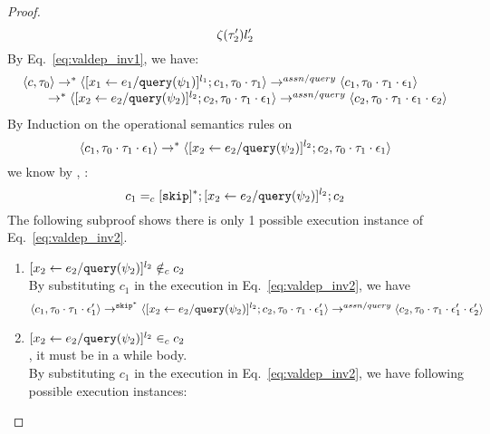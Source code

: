 {\begin{proof}
\begin{equation}
  \mathtt{\zeta}(\mathtt{\tau}_2') l_2'
\end{equation}
%
%
%
 By Eq.~\ref{eq:valdep_inv1}, we have:
\[
  \begin{array}{l}   
\langle {c}, \mathtt{\tau}_0 \rangle \rightarrow^{*} 
\langle [\mathrel{ {x}_1 \leftarrow e_1 / {\tt query}(\psi_1) }]^{l_1} ; {c}_1, \mathtt{\tau}_0 \cdot \mathtt{\tau}_1 \rangle  \rightarrow^{assn/query}
 \langle c_1, \mathtt{\tau}_0 \cdot \mathtt{\tau}_1 \cdot \mathtt{\epsilon}_1 \rangle \\
  \qquad \rightarrow^{*} 
  \langle [\mathrel{ {x}_2 \leftarrow e_2 / {\tt query}(\psi_2) }]^{l_2};{c}_2, 
  \mathtt{\tau}_0 \cdot \mathtt{\tau}_1 \cdot \mathtt{\epsilon}_1 \rangle 
  \rightarrow^{assn/query} 
  \langle {c}_2,  \mathtt{\tau}_0 \cdot \mathtt{\tau}_1 \cdot \mathtt{\epsilon}_1 \cdot \mathtt{\epsilon}_2 \rangle 
\end{array}
 \]
 By Induction on the operational semantics rules on 
 \[\langle c_1, \mathtt{\tau}_0 \cdot \mathtt{\tau}_1 \cdot \mathtt{\epsilon}_1 \rangle
  \rightarrow^{*} 
  \langle [\mathrel{ {x}_2 \leftarrow e_2 / {\tt query}(\psi_2) }]^{l_2};{c}_2, 
  \mathtt{\tau}_0 \cdot \mathtt{\tau}_1 \cdot \mathtt{\epsilon}_1 \rangle \]
 we know by  , :
 \[
 c_1 =_c 
 [\mathtt{skip}]{}^*;[\mathrel{ {x}_2 \leftarrow e_2 / {\tt query}(\psi_2) }]^{l_2};{c}_2
 \]
The following subproof shows there is only 1 possible execution instance of Eq.~\ref{eq:valdep_inv2}.
\begin{subproof}
\label{pf:noiteration_inv2}
\begin{enumerate}
There are two possible cases, 
where $[\assign{{x}_2}{\expr_2 / \query(\qexpr_2)}]^{l_2} \in_c c_2$ 
or $[\assign{{x}_2}{\expr_2 / \query(\qexpr_2)}]^{l_2} \notin_c c_2$.
\\
\item{$[\assign{{x}_2}{\expr_2 / \query(\qexpr_2)}]^{l_2}\notin_c c_2$}
\\
By substituting $c_1$ in the execution in Eq.~\ref{eq:valdep_inv2}, we have 
  \[
  \langle c_1, \mathtt{\tau}_0 \cdot \mathtt{\tau}_1 \cdot \mathtt{\epsilon}_1' \rangle 
  \rightarrow^{\mathtt{skip}^*} 
  \langle [\mathrel{ {x}_2 \leftarrow e_2 / {\tt query}(\psi_2) }]^{l_2} ; {c}_2, \mathtt{\tau}_0 \cdot \mathtt{\tau}_1 \cdot \mathtt{\epsilon}_1' \rangle 
  \rightarrow^{assn/query} 
  \langle {c}_2,  \mathtt{\tau}_0 \cdot \mathtt{\tau}_1 \cdot \mathtt{\epsilon}_1' \cdot \mathtt{\epsilon}_2' \rangle 
 \]
%
\item{$[\assign{{x}_2}{\expr_2 / \query(\qexpr_2)}]^{l_2} \in_c c_2$}
\\
, it must be in a while body.
\\
 By substituting $c_1$ in the execution in Eq.~\ref{eq:valdep_inv2}, we have following possible execution instances:

\end{enumerate}
\end{subproof}
\end{proof}}
